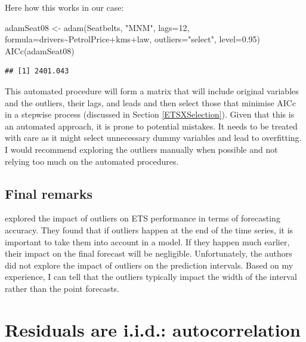 \documentclass[
]{book}
\newenvironment{Shaded}{\begin{snugshade}}{\end{snugshade}}
\newcommand{\AttributeTok}[1]{\textcolor[rgb]{0.77,0.63,0.00}{#1}}
\newcommand{\DecValTok}[1]{\textcolor[rgb]{0.00,0.00,0.81}{#1}}
\newcommand{\FloatTok}[1]{\textcolor[rgb]{0.00,0.00,0.81}{#1}}
\newcommand{\FunctionTok}[1]{\textcolor[rgb]{0.00,0.00,0.00}{#1}}
\newcommand{\NormalTok}[1]{#1}
\newcommand{\OtherTok}[1]{\textcolor[rgb]{0.56,0.35,0.01}{#1}}
\newcommand{\SpecialCharTok}[1]{\textcolor[rgb]{0.00,0.00,0.00}{#1}}
\newcommand{\StringTok}[1]{\textcolor[rgb]{0.31,0.60,0.02}{#1}}
\theoremstyle{definition}
\theoremstyle{definition}
\theoremstyle{definition}
\theoremstyle{definition}
\theoremstyle{remark}
\begin{document}
Here how this works in our case:

\begin{Shaded}
\begin{Highlighting}[]
\NormalTok{adamSeat08 }\OtherTok{\textless{}{-}} \FunctionTok{adam}\NormalTok{(Seatbelts, }\StringTok{"MNM"}\NormalTok{, }\AttributeTok{lags=}\DecValTok{12}\NormalTok{,}
                   \AttributeTok{formula=}\NormalTok{drivers}\SpecialCharTok{\textasciitilde{}}\NormalTok{PetrolPrice}\SpecialCharTok{+}\NormalTok{kms}\SpecialCharTok{+}\NormalTok{law,}
                   \AttributeTok{outliers=}\StringTok{"select"}\NormalTok{, }\AttributeTok{level=}\FloatTok{0.95}\NormalTok{)}
\FunctionTok{AICc}\NormalTok{(adamSeat08)}
\end{Highlighting}
\end{Shaded}

\begin{verbatim}
## [1] 2401.043
\end{verbatim}

This automated procedure will form a matrix that will include original variables and the outliers, their lags, and leads and then select those that minimise AICc in a stepwise process (discussed in Section \ref{ETSXSelection}). Given that this is an automated approach, it is prone to potential mistakes. It needs to be treated with care as it might select unnecessary dummy variables and lead to overfitting. I would recommend exploring the outliers manually when possible and not relying too much on the automated procedures.

\hypertarget{final-remarks}{%
\subsection{Final remarks}\label{final-remarks}}

\citet{Koehler2012} explored the impact of outliers on ETS performance in terms of forecasting accuracy. They found that if outliers happen at the end of the time series, it is important to take them into account in a model. If they happen much earlier, their impact on the final forecast will be negligible. Unfortunately, the authors did not explore the impact of outliers on the prediction intervals. Based on my experience, I can tell that the outliers typically impact the width of the interval rather than the point forecasts.

\hypertarget{diagnosticsResidualsIIDAuto}{%
\section{Residuals are i.i.d.: autocorrelation}\label{diagnosticsResidualsIIDAuto}}
\end{document}
